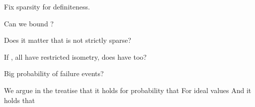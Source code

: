 {
\I Fix sparsity  for definiteness.

\I Can we bound ?

\I Does it matter that  is not strictly sparse?

\I If , all have restricted isometry, does  have too?

\I Big  probability of failure events?
}
{
\I We argue in the treatise that it holds for probability  that
%
\I For ideal values
%
\I And it holds that
}



